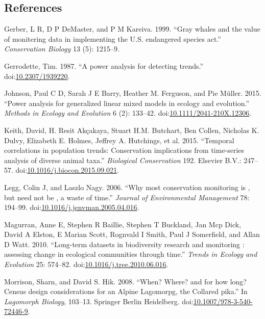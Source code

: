 \documentclass[11pt,]{article}
\begin{document}
\subsection*{References}\label{references}

\hypertarget{refs}{}
\hypertarget{ref-Gerber1999}{}
Gerber, L R, D P DeMaster, and P M Kareiva. 1999. ``Gray whales and the
value of monitering data in implementing the U.S. endangered species
act.'' \emph{Conservation Biology} 13 (5): 1215--9.

\hypertarget{ref-Gerrodette1987}{}
Gerrodette, Tim. 1987. ``A power analysis for detecting trends.''
doi:\href{https://doi.org/10.2307/1939220}{10.2307/1939220}.

\hypertarget{ref-Johnson2015}{}
Johnson, Paul C D, Sarah J E Barry, Heather M. Ferguson, and Pie Müller.
2015. ``Power analysis for generalized linear mixed models in ecology
and evolution.'' \emph{Methods in Ecology and Evolution} 6 (2): 133--42.
doi:\href{https://doi.org/10.1111/2041-210X.12306}{10.1111/2041-210X.12306}.

\hypertarget{ref-Keith2015}{}
Keith, David, H. Resit Akçakaya, Stuart H.M. Butchart, Ben Collen,
Nicholas K. Dulvy, Elizabeth E. Holmes, Jeffrey A. Hutchings, et al.
2015. ``Temporal correlations in population trends: Conservation
implications from time-series analysis of diverse animal taxa.''
\emph{Biological Conservation} 192. Elsevier B.V.: 247--57.
doi:\href{https://doi.org/10.1016/j.biocon.2015.09.021}{10.1016/j.biocon.2015.09.021}.

\hypertarget{ref-Legg2006}{}
Legg, Colin J, and Laszlo Nagy. 2006. ``Why most conservation monitoring
is , but need not be , a waste of time.'' \emph{Journal of Environmental
Management} 78: 194--99.
doi:\href{https://doi.org/10.1016/j.jenvman.2005.04.016}{10.1016/j.jenvman.2005.04.016}.

\hypertarget{ref-Magurran2010}{}
Magurran, Anne E, Stephen R Baillie, Stephen T Buckland, Jan Mcp Dick,
David A Elston, E Marian Scott, Rognvald I Smith, Paul J Somerfield, and
Allan D Watt. 2010. ``Long-term datasets in biodiversity research and
monitoring : assessing change in ecological communities through time.''
\emph{Trends in Ecology and Evolution} 25: 574--82.
doi:\href{https://doi.org/10.1016/j.tree.2010.06.016}{10.1016/j.tree.2010.06.016}.

\hypertarget{ref-Morrison2008}{}
Morrison, Sharn, and David S. Hik. 2008. ``When? Where? and for how
long? Census design considerations for an Alpine Lagomorpg, the Collared
pika.'' In \emph{Lagomorph Biology}, 103--13. Springer Berlin
Heidelberg.
doi:\href{https://doi.org/10.1007/978-3-540-72446-9}{10.1007/978-3-540-72446-9}.
\end{document}
